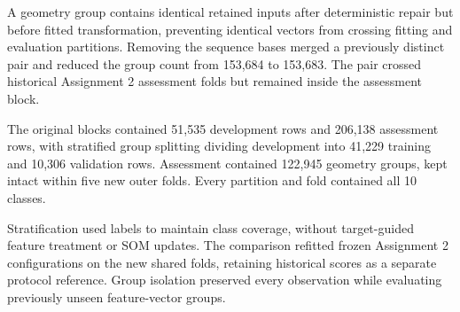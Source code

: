 A geometry group contains identical retained inputs after deterministic repair but before fitted transformation, preventing identical vectors from crossing fitting and evaluation partitions. Removing the sequence bases merged a previously distinct pair and reduced the group count from 153,684 to 153,683. The pair crossed historical Assignment 2 assessment folds but remained inside the assessment block.

The original blocks contained 51,535 development rows and 206,138 assessment rows, with stratified group splitting dividing development into 41,229 training and 10,306 validation rows. Assessment contained 122,945 geometry groups, kept intact within five new outer folds. Every partition and fold contained all 10 classes.

Stratification used labels to maintain class coverage, without target-guided feature treatment or SOM updates. The comparison refitted frozen Assignment 2 configurations on the new shared folds, retaining historical scores as a separate protocol reference. Group isolation preserved every observation while evaluating previously unseen feature-vector groups.
